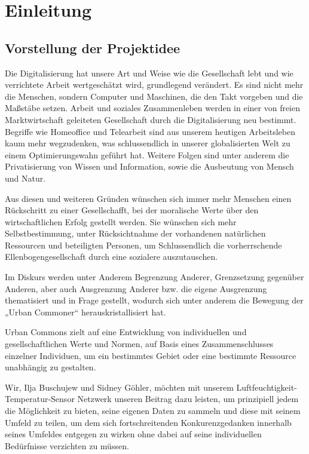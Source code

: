 
\chapter{Einleitung} \label{Einleitung}

\section{Vorstellung der Projektidee} \label{Vorstellung der Projektidee}

Die Digitalisierung hat unsere Art und Weise wie die Gesellschaft lebt und wie verrichtete Arbeit wertgeschätzt wird, grundlegend verändert. Es sind nicht mehr die Menschen, sondern Computer und Maschinen, die den Takt vorgeben und die Maßstäbe setzen. Arbeit und soziales Zusammenleben werden in einer von freien Marktwirtschaft geleiteten Gesellschaft durch die Digitalisierung neu bestimmt. Begriffe wie Homeoffice und Telearbeit sind aus unserem heutigen Arbeitsleben kaum mehr wegzudenken, was schlussendlich in unserer globalisierten Welt zu einem Optimierungswahn geführt hat. Weitere Folgen sind unter anderem die Privatisierung von Wissen und Information, sowie die Ausbeutung von Mensch und Natur.

Aus diesen und weiteren Gründen wünschen sich immer mehr Menschen einen Rückschritt zu einer Gesellschafft, bei der moralische Werte über den wirtschaftlichen Erfolg gestellt werden.
Sie wünschen sich mehr Selbstbestimmung, unter Rücksichtnahme der vorhandenen natürlichen Ressourcen und beteiligten Personen, um Schlussendlich die vorherrschende Ellenbogengesellschaft durch eine sozialere auszutauschen.

Im Diskurs werden unter Anderem Begrenzung Anderer, Grenzsetzung gegenüber Anderen, aber auch Ausgrenzung Anderer bzw. die eigene Ausgrenzung thematisiert und in Frage gestellt, wodurch sich unter anderem die Bewegung der „Urban Commoner“ herauskristallisiert hat.

Urban Commons zielt auf eine Entwicklung von individuellen und gesellschaftlichen Werte und Normen, auf Basis eines Zusammenschlusses einzelner Individuen, um ein bestimmtes Gebiet oder eine bestimmte Ressource unabhängig zu gestalten.

Wir, Ilja Buschujew und Sidney Göhler, möchten mit unserem Luftfeuchtigkeit-Temperatur-Sensor Netzwerk unseren Beitrag dazu leisten, um prinzipiell jedem die Möglichkeit zu bieten, seine eigenen Daten zu sammeln und diese mit seinem Umfeld zu teilen, um dem sich fortschreitenden Konkurenzgedanken innerhalb seines Umfeldes entgegen zu wirken ohne dabei auf seine individuellen Bedürfnisse verzichten zu müssen.

